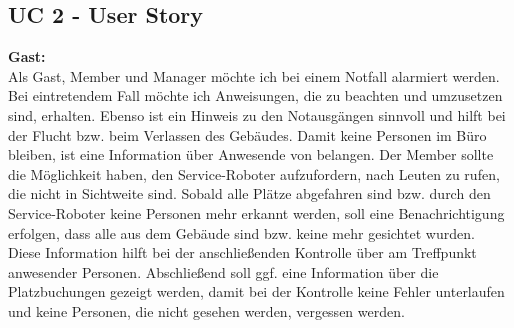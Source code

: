 \documentclass[
  ngerman           %
  ,twoside          %
  ,11pt
  ,pdftex
]{report}
\begin{document}
	

\subsection*{UC 2 - User Story}
\textbf{Gast:}
\\
Als Gast, Member und Manager möchte ich bei einem Notfall alarmiert werden. Bei eintretendem Fall möchte ich 
Anweisungen, die zu beachten und umzusetzen sind, erhalten. Ebenso ist ein Hinweis zu den Notausgängen 
sinnvoll und hilft bei der Flucht bzw. beim Verlassen des Gebäudes. Damit keine Personen im Büro 
bleiben, ist eine Information über Anwesende von belangen. Der Member sollte die Möglichkeit haben, den 
Service-Roboter aufzufordern, nach Leuten zu rufen, die nicht in Sichtweite sind. Sobald alle Plätze 
abgefahren sind bzw. durch den Service-Roboter keine Personen mehr erkannt werden, soll eine Benachrichtigung 
erfolgen, dass alle aus dem Gebäude sind bzw. keine mehr gesichtet wurden. Diese Information hilft bei der 
anschließenden Kontrolle über am Treffpunkt anwesender Personen. Abschließend soll ggf. eine Information über die 
Platzbuchungen gezeigt werden, damit bei der Kontrolle keine Fehler unterlaufen und keine Personen, die nicht 
gesehen werden, vergessen werden.
\end{document}
